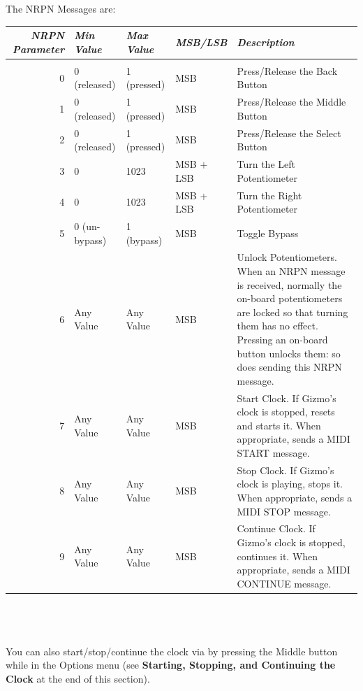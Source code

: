 \documentclass{article}
\begin{document}
\begin{description}
		The NRPN Messages are:
		
		\noindent\begin{tabular}{@{}rlllp{2.4in}@{}}
		{\it NRPN Parameter}&{\it Min  Value}&{\it Max Value}&{\it MSB/LSB}&{\it Description}\\[0.1em]
		\hline\\[-0.9em]
		0	&0 (released)	&1 (pressed) & MSB& Press/Release the Back Button\\
		1	&0 (released)	&1 (pressed) & MSB & Press/Release the Middle Button\\
		2	&0 (released)	&1 (pressed) & MSB & Press/Release the Select Button\\
		3	&0	& 1023 & MSB + LSB & Turn the Left Potentiometer\\
		4	&0	& 1023 & MSB + LSB & Turn the Right Potentiometer\\
		5	&0 (un-bypass)	&1 (bypass) & MSB& Toggle Bypass\\
		6	& Any Value &Any Value & MSB& Unlock Potentiometers.  When an NRPN message is received, normally the on-board potentiometers are locked so that turning them has no effect.  Pressing an on-board button unlocks them: so does sending this NRPN message.\\
		7	&	Any Value &Any Value & MSB& Start Clock.  If Gizmo's clock is stopped, resets and starts it.  When appropriate, sends a MIDI START message.\\
		8	& Any Value	&Any Value & MSB& Stop Clock.  If Gizmo's clock is playing, stops it.  When appropriate, sends a MIDI STOP message.\\
		9	&	Any Value &Any Value & MSB & Continue Clock.    If Gizmo's clock is stopped, continues it.  When appropriate, sends a MIDI CONTINUE message.\\
		\end{tabular}\\
		\\
		\\
		You can also start/stop/continue the clock via by pressing the Middle button while in the Options menu (see {\bf Starting, Stopping, and Continuing the Clock} at the end of this section).
		

\end{description}
\end{document}
